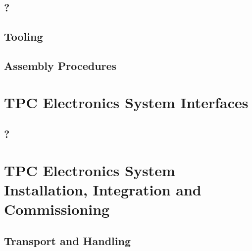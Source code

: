 \subsection{?}
\label{sec:fdsp-tpc-elec-?}



\subsection{Tooling}
\label{sec:fdsp-tpc-elec-tooling}


\subsection{Assembly Procedures}
\label{sec:fdsp-tpc-elec-assy}



\section{TPC Electronics System Interfaces}
\label{sec:fdsp-tpc-elec-intfc}



\subsection{?}
\label{sec:fdsp-tpc-elec-intfc-?}




\section{TPC Electronics System Installation, Integration and Commissioning}
\label{sec:fdsp-tpc-elec-install}

\subsection{Transport and Handling}
\label{sec:fdsp-tpc-elec-install-transport}


